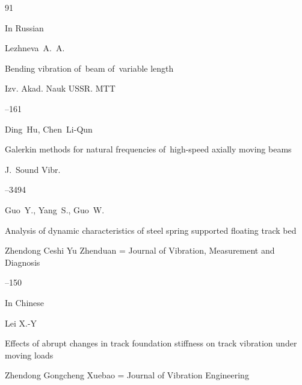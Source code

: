\begin{thebibliography}{91}




\lang In Russian

\by Lezhneva~A.~A.

\paper Bending vibration of~beam of~variable length

\jour Izv. Akad. Nauk USSR. MTT



--161








\by Ding~Hu, Chen~Li-Qun

\paper Galerkin methods for natural frequencies of~high-speed axially moving beams

\jour J.~Sound Vibr.




--3494





\by Guo~Y.,  Yang~S.,  Guo~W.

\paper Analysis of dynamic characteristics of steel spring supported floating track bed 

\jour Zhendong Ceshi Yu Zhenduan = Journal of Vibration, Measurement and Diagnosis




--150

\lang In  Chinese







\by Lei X.-Y

\paper Effects of abrupt changes in track foundation stiffness on track vibration under moving loads

\jour Zhendong Gongcheng Xuebao  = Journal of Vibration Engineering



\end{thebibliography}
